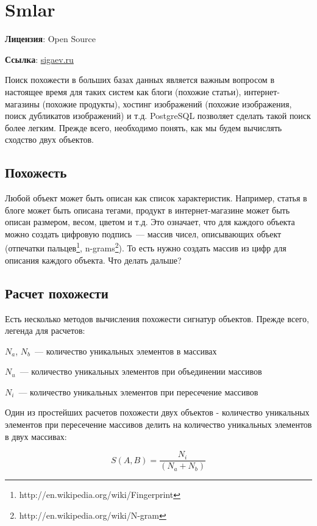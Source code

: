 \section{Smlar}
\textbf{Лицензия}: Open Source

\textbf{Ссылка}: \href{http://sigaev.ru/git/gitweb.cgi?p=smlar.git;a=blob;hb=HEAD;f=README}{sigaev.ru}

Поиск похожести в больших базах данных является важным вопросом в настоящее время для таких систем как блоги (похожие статьи), интернет-магазины (похожие продукты), хостинг изображений (похожие изображения, поиск дубликатов изображений) и т.д. PostgreSQL позволяет сделать такой поиск более легким. Прежде всего, необходимо понять, как мы будем вычислять сходство двух объектов.

\subsection{Похожесть}

Любой объект может быть описан как список характеристик. Например, статья в блоге может быть описана тегами, продукт в интернет-магазине может быть описан размером, весом, цветом и т.д. Это означает, что для каждого объекта можно создать цифровую подпись~--- массив чисел, описывающих объект (отпечатки пальцев\footnote{http://en.wikipedia.org/wiki/Fingerprint}, n-grams\footnote{http://en.wikipedia.org/wiki/N-gram}). То есть нужно создать массив из цифр для описания каждого объекта. Что делать дальше?

\subsection{Расчет похожести}

Есть несколько методов вычисления похожести сигнатур объектов. Прежде всего, легенда для расчетов:

$N_a$, $N_b$~--- количество уникальных элементов в массивах

$N_u$~--- количество уникальных элементов при объединении массивов

$N_i$~--- количество уникальных элементов при пересечение массивов

Один из простейших расчетов похожести двух объектов - количество уникальных элементов при пересечение массивов делить на количество уникальных элементов в двух массивах:

\begin{equation}
 \label{eq:smlar1}
 S(A,B) = \frac{N_{i}}{(N_{a}+N_{b})}
\end{equation}

